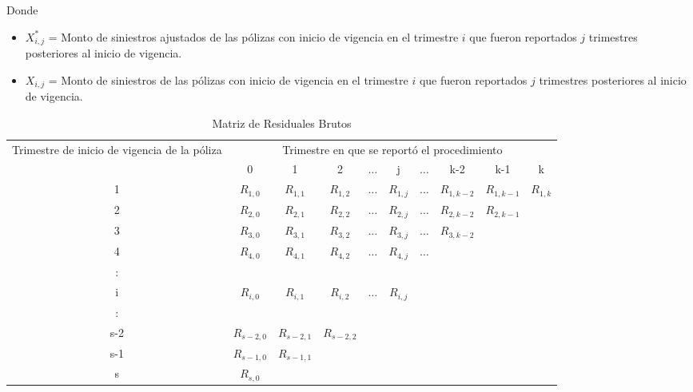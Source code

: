 \documentclass[11pt,twoside,openright,spanish]{report}
\numberwithin{equation}{chapter}
\numberwithin{figure}{chapter}
\numberwithin{table}{chapter}
\begin{document}
	Donde 
	
	\begin{itemize}
			\setlength\itemsep{-0.5em}
		\item ${X}_{i,j}^{*}$ = Monto de siniestros ajustados de las pólizas con inicio de vigencia en el trimestre $i$ que fueron reportados $j$ trimestres posteriores al inicio de vigencia.
		\item ${X}_{i,j}$ = Monto de siniestros de las pólizas con inicio de vigencia en el trimestre $i$ que fueron reportados $j$ trimestres posteriores al inicio de vigencia.	
		\end{itemize}
		

	\begin{table}[ht]
		\centering
		\begin{tabularx}{\linewidth}{ c|ccccccccc}
			\multirow{2}{4cm}{Trimestre de inicio de vigencia de la póliza}
			& \multicolumn{9}{c}{Trimestre en que se reportó el procedimiento} \\
			& 0  & 1 & 2 & $ \dots $ & j & $\dots $ & k-2 & k-1 &  k \\
			\midrule
			1      &  $R_{1,0}^{ }$ & $R_{1,1}^{ }$ & $R_{1,2}^{ }$ & $ \dots $ & $R_{1,j}^{ }$ & $ \dots $ & $R_{1,k-2}^{ }$ & $R_{1,k-1}^{ }$ & $R_{1,k}^{ }$ \\
			2      &  $R_{2,0}^{ }$ & $R_{2,1}^{ }$ & $R_{2,2}^{ }$ & $ \dots $ & $R_{2,j}^{ }$ & $ \dots $ & $R_{2,k-2}^{ }$ & $R_{2,k-1}^{ }$ & \\
			3      &  $R_{3,0}^{ }$ & $R_{3,1}^{ }$ & $R_{3,2}^{ }$ & $ \dots $ & $R_{3,j}^{ }$ & $ \dots $ & $R_{3,k-2}^{ }$ & & \\
			4      &  $R_{4,0}^{ }$ & $R_{4,1}^{ }$ & $R_{4,2}^{ }$ & $ \dots $ & $R_{4,j}^{ }$ & $ \dots $ & & & \\
			:      & & & & & & & & & \\
			i      &  $R_{i,0}^{ }$ & $R_{i,1}^{ }$ & $R_{i,2}^{ }$ & $ \dots $ & $R_{i,j}^{ }$ & & & & \\
			:      & & & & & & & & & \\
			s-2      &  $R_{s-2,0}^{ }$ & $R_{s-2,1}^{ }$ & $R_{s-2,2}^{ }$ & & & & & & \\
			s-1      &  $R_{s-1,0}^{ }$ & $R_{s-1,1}^{ }$ & & & & & & & \\
			s      &  $R_{s,0}^{ }$ & & & & & & & & \\
		\end{tabularx}
	\caption{Matriz de Residuales Brutos}
	\label{matrix5}
	\end{table}
 
\end{document}
